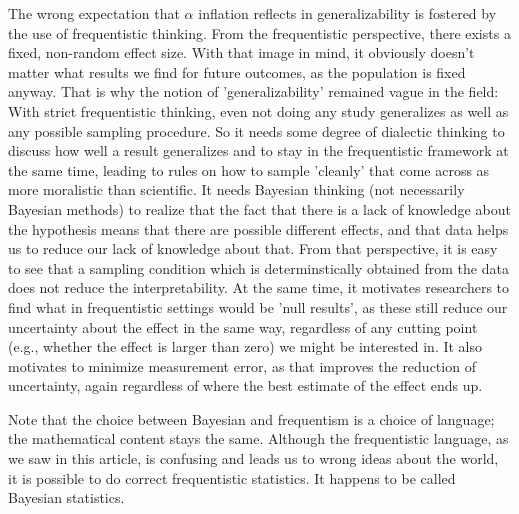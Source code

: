 \documentclass[man]{apa7}
\theoremstyle{definition}
\begin{document}
The wrong expectation that $\alpha$ inflation reflects in generalizability is fostered by the use of frequentistic thinking. From the frequentistic perspective, there exists a fixed, non-random effect size. With that image in mind, it obviously doesn't matter what results we find for future outcomes, as the population is fixed anyway. That is why the notion of 'generalizability' remained vague in the field: With strict frequentistic thinking, even not doing any study generalizes as well as any possible sampling procedure. So it needs some degree of dialectic thinking to discuss how well a result generalizes and to stay in the frequentistic framework at the same time, leading to rules on how to sample 'cleanly' that come across as more moralistic than scientific. It needs Bayesian thinking (not necessarily Bayesian methods) to realize that the fact that there is a lack of knowledge about the hypothesis means that there are possible different effects, and that data helps us to reduce our lack of knowledge about that. From that perspective, it is easy to see that a sampling condition which is determinstically obtained from the data does not reduce the interpretability. At the same time, it motivates researchers to find what in frequentistic settings would be 'null results', as these still reduce our uncertainty about the effect in the same way, regardless of any cutting point (e.g., whether the effect is larger than zero) we might be interested in. It also motivates to minimize measurement error, as that improves the reduction of uncertainty, again regardless of where the best estimate of the effect ends up. 

Note that the choice between Bayesian and frequentism is a choice of language; the mathematical content stays the same. Although the frequentistic language, as we saw in this article, is confusing and leads us to wrong ideas about the world, it is possible to do correct frequentistic statistics. It happens to be called Bayesian statistics.

\printbibliography
\end{document}
